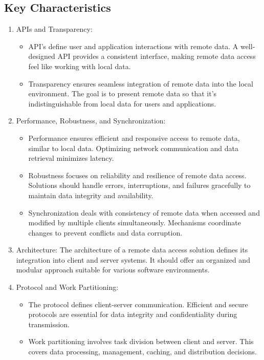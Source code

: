 \documentclass{report}
\begin{document}
\subsection{Key Characteristics}
\begin{enumerate}[label=\textit{(\roman*)}]
\item APIs and Transparency:
  \begin{itemize}[label=\textit{-}]
  \item API's define user and application interactions with remote data. A well-designed API
    provides a consistent interface, making remote data access feel like working with local data.
  \item Transparency ensures seamless integration of remote data into the local
    environment. The goal is to present remote data so that it's indistinguishable from local data for
    users and applications.
  \end{itemize}
\item Performance, Robustness, and Synchronization:
  \begin{itemize}[label=\textit{-}]
  \item Performance ensures efficient and responsive access to remote data, similar to
    local data. Optimizing network communication and data retrieval minimizes latency.
  \item Robustness focuses on reliability and resilience of remote data access. Solutions
    should handle errors, interruptions, and failures gracefully to maintain data integrity and
    availability.
  \item Synchronization deals with consistency of remote data when accessed and modified
    by multiple clients simultaneously. Mechanisms coordinate changes to prevent conflicts and data
    corruption.
  \end{itemize}
\item Architecture: The architecture of a remote data access solution defines its integration
  into client and server systems. It should offer an organized and modular approach suitable for
  various software environments.
\item Protocol and Work Partitioning:
  \begin{itemize}[label=\textit{-}]
  \item The protocol defines client-server communication. Efficient and secure protocols
    are essential for data integrity and confidentiality during transmission.
  \item Work partitioning involves task division between client and server. This covers
    data processing, management, caching, and distribution decisions.
  \end{itemize}
\end{enumerate}
\end{document}

